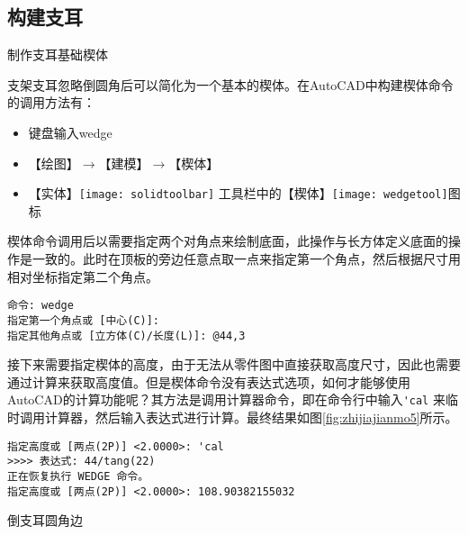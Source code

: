 \subsection{构建支耳}
\begin{procedure}
\item 制作支耳基础楔体

支架支耳忽略倒圆角后可以简化为一个基本的楔体。在AutoCAD中构建楔体命令的调用方法有：
\begin{itemize}
\item 键盘输入wedge
\item 【绘图】$\rightarrow $【建模】$\rightarrow $【楔体】
\item 【实体】\texttt{[image: solidtoolbar]} 工具栏中的【楔体】\texttt{[image: wedgetool]}图标
\end{itemize}

楔体命令调用后以需要指定两个对角点来绘制底面，此操作与长方体定义底面的操作是一致的。此时在顶板的旁边任意点取一点来指定第一个角点，然后根据尺寸用相对坐标指定第二个角点。

\begin{lstlisting}
命令: wedge
指定第一个角点或 [中心(C)]:
指定其他角点或 [立方体(C)/长度(L)]: @44,3
\end{lstlisting}

接下来需要指定楔体的高度，由于无法从零件图中直接获取高度尺寸，因此也需要通过计算来获取高度值。但是楔体命令没有表达式选项，如何才能够使用AutoCAD的计算功能呢？其方法是调用计算器命令，即在命令行中输入\lstinline{'cal} 来临时调用计算器，然后输入表达式进行计算。最终结果如图\ref{fig:zhijiajianmo5}所示。
\begin{lstlisting}
指定高度或 [两点(2P)] <2.0000>: 'cal
>>>> 表达式: 44/tang(22)
正在恢复执行 WEDGE 命令。
指定高度或 [两点(2P)] <2.0000>: 108.90382155032
\end{lstlisting}

\begin{figure}[htbp]
\centering
\begin{floatrow}[3]
\end{floatrow}
\end{figure}
\item 倒支耳圆角边


\end{procedure}
